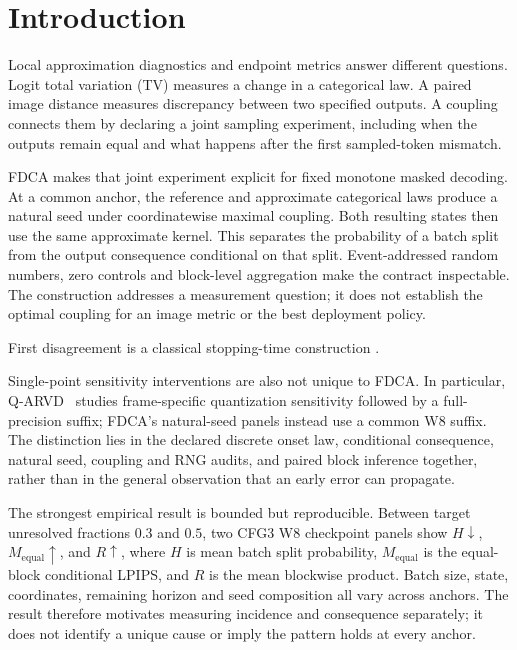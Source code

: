 \documentclass[11pt,a4paper]{article}
\theoremstyle{plain}
\theoremstyle{definition}
\theoremstyle{remark}
\newcommand{\Meq}{M_{\mathrm{equal}}}
\begin{document}
\section{Introduction}
Local approximation diagnostics and endpoint metrics answer different questions.
Logit total variation (TV) measures a change in a categorical law. A paired image
distance measures discrepancy between two specified outputs. A coupling connects
them by declaring a joint sampling experiment, including when the outputs remain
equal and what happens after the first sampled-token mismatch.

FDCA makes that joint experiment explicit for fixed monotone masked decoding.
At a common anchor, the reference and approximate categorical laws produce a
natural seed under coordinatewise maximal coupling. Both resulting states then
use the same approximate kernel. This separates the probability of a batch split
from the output consequence conditional on that split. Event-addressed random
numbers, zero controls and block-level aggregation make the contract inspectable.
The construction addresses a measurement question; it does not establish the
optimal coupling for an image metric or the best deployment policy.

First disagreement is a classical stopping-time construction
\citep{lindvall2002coupling,vollering2016maximal,ernst2019mexit}.

Single-point sensitivity interventions are also not unique to FDCA. In particular,
Q-ARVD~\citep{tang2026qarvd} studies frame-specific quantization sensitivity
followed by a full-precision suffix; FDCA's natural-seed panels instead use a common W8 suffix. The distinction
lies in the declared discrete onset law, conditional consequence, natural seed,
coupling and RNG audits, and paired block inference together, rather than in the
general observation that an early error can propagate.

The strongest empirical result is bounded but reproducible. Between target
unresolved fractions $0.3$ and $0.5$, two CFG3 W8 checkpoint panels show
$H\downarrow$, $\Meq\uparrow$, and $R\uparrow$, where $H$ is mean batch split
probability, $\Meq$ is the equal-block conditional LPIPS, and $R$ is the mean
blockwise product. Batch size, state, coordinates, remaining horizon and seed
composition all vary across anchors. The result therefore motivates measuring
incidence and consequence separately; it does not identify a unique cause or
imply the pattern holds at every anchor.
\end{document}

